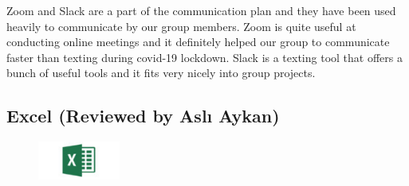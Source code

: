 \documentclass[]{article}
\begin{document}
Zoom and Slack are a part of the communication plan and they have been
used heavily to communicate by our group members. Zoom is quite useful
at conducting online meetings and it definitely helped our group to
communicate faster than texting during covid-19 lockdown. Slack is a
texting tool that offers a bunch of useful tools and it fits very nicely
into group projects.

\hypertarget{excel-reviewed-by-aslux131-aykan}{%
    \subsection{Excel (Reviewed by Aslı
        Aykan)}\label{excel-reviewed-by-aslux131-aykan}}

\begin{figure}
    \centering
    \includegraphics[height=0.5in]{./images/6.jpg}
\end{figure}
\end{document}
